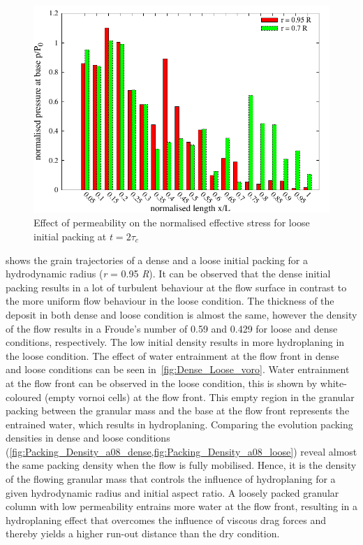 \begin{figure}
\centering
\includegraphics[width=0.97\columnwidth]{a08/effective_stress_a08}
\caption{Effect of permeability on the normalised effective stress for loose 
initial packing at $t = 2\tau_c$}
\label{fig:effective_stress_a08}
\end{figure}

 shows the grain trajectories of a dense and a loose 
initial packing for a hydrodynamic radius (\textit{r} = 0.95 \textit{R}). It 
can be observed that 
the dense initial packing results in a lot of turbulent behaviour at the flow 
surface in contrast to the more uniform flow behaviour in the loose condition. 
The thickness of the deposit in both dense and loose condition is almost the 
same, however the density of the flow results in a Froude's number of 0.59 and
0.429 for loose and dense conditions, respectively. The low initial density 
results in more hydroplaning in the loose condition. The effect of water 
entrainment at the flow front in dense and loose conditions can be seen 
in~\cref{fig:Dense_Loose_voro}. Water entrainment at the flow front can be 
observed in the loose condition, this is shown by white-coloured (empty vornoi 
cells) at the flow front. This empty region in the granular packing between the 
granular mass and the base at the flow front represents the entrained water, 
which results in hydroplaning. Comparing the evolution packing densities in 
dense and loose conditions
(\cref{fig:Packing_Density_a08_dense,fig:Packing_Density_a08_loose}) 
reveal almost the same packing density when the flow is fully mobilised. Hence, 
it is the density of the flowing granular mass that controls the influence of 
hydroplaning for a given hydrodynamic radius and initial aspect ratio. A 
loosely packed granular column with low permeability entrains 
more water at the flow front, resulting in a hydroplaning effect that overcomes 
the influence of viscous drag forces and thereby yields a higher run-out 
distance than the dry condition.

